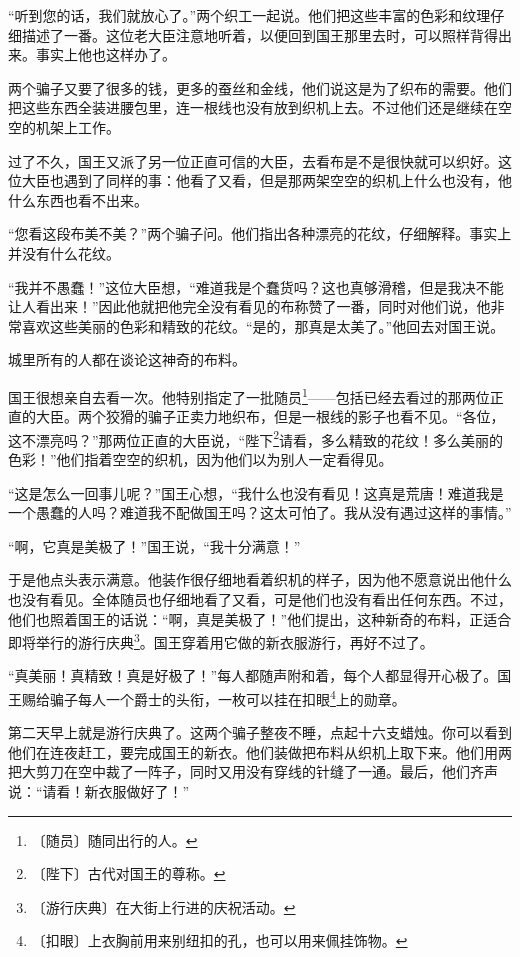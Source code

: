 \documentclass[12pt,UTF-8,openany]{ctexbook}
\begin{document}
\begin{normalsize}
    “听到您的话，我们就放心了。”两个织工一起说。他们把这些丰富的色彩和纹理仔细描述了一番。这位老大臣注意地听着，以便回到国王那里去时，可以照样背得出来。事实上他也这样办了。
    
    两个骗子又要了很多的钱，更多的蚕丝和金线，他们说这是为了织布的需要。他们把这些东西全装进腰包里，连一根线也没有放到织机上去。不过他们还是继续在空空的机架上工作。
    
    过了不久，国王又派了另一位正直可信的大臣，去看布是不是很快就可以织好。这位大臣也遇到了同样的事：他看了又看，但是那两架空空的织机上什么也没有，他什么东西也看不出来。
    
    “您看这段布美不美？”两个骗子问。他们指出各种漂亮的花纹，仔细解释。事实上并没有什么花纹。
    
    “我并不愚蠢！”这位大臣想，“难道我是个蠢货吗？这也真够滑稽，但是我决不能让人看出来！”因此他就把他完全没有看见的布称赞了一番，同时对他们说，他非常喜欢这些美丽的色彩和精致的花纹。“是的，那真是太美了。”他回去对国王说。
    
    城里所有的人都在谈论这神奇的布料。
    
    国王很想亲自去看一次。他特别指定了一批随员\footnote{〔随员〕随同出行的人。}——包括已经去看过的那两位正直的大臣。两个狡猾的骗子正卖力地织布，但是一根线的影子也看不见。“各位，这不漂亮吗？”那两位正直的大臣说，“陛下\footnote{〔陛下〕古代对国王的尊称。}请看，多么精致的花纹！多么美丽的色彩！”他们指着空空的织机，因为他们以为别人一定看得见。
    
    “这是怎么一回事儿呢？”国王心想，“我什么也没有看见！这真是荒唐！难道我是一个愚蠢的人吗？难道我不配做国王吗？这太可怕了。我从没有遇过这样的事情。”
    
    “啊，它真是美极了！”国王说，“我十分满意！”
    
    于是他点头表示满意。他装作很仔细地看着织机的样子，因为他不愿意说出他什么也没有看见。全体随员也仔细地看了又看，可是他们也没有看出任何东西。不过，他们也照着国王的话说：“啊，真是美极了！”他们提出，这种新奇的布料，正适合即将举行的游行庆典\footnote{〔游行庆典〕在大街上行进的庆祝活动。}。国王穿着用它做的新衣服游行，再好不过了。
    
    “真美丽！真精致！真是好极了！”每人都随声附和着，每个人都显得开心极了。国王赐给骗子每人一个爵士的头衔，一枚可以挂在扣眼\footnote{〔扣眼〕上衣胸前用来别纽扣的孔，也可以用来佩挂饰物。}上的勋章。
    
    第二天早上就是游行庆典了。这两个骗子整夜不睡，点起十六支蜡烛。你可以看到他们在连夜赶工，要完成国王的新衣。他们装做把布料从织机上取下来。他们用两把大剪刀在空中裁了一阵子，同时又用没有穿线的针缝了一通。最后，他们齐声说：“请看！新衣服做好了！”
    

\end{normalsize}
\end{document}
